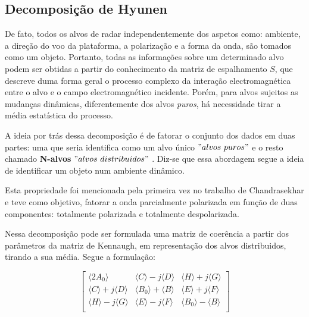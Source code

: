 \documentclass{article}
\begin{document}
\subsection{\textbf{Decomposição de Hyunen}}

De fato, todos os alvos de radar independentemente dos aspetos como: ambiente, a direção do voo da plataforma, a polarização e a forma da onda, são tomados como um objeto. Portanto, todas as informações sobre um determinado alvo podem ser obtidas a partir do conhecimento da matriz de espalhamento $S$, que descreve duma forma geral o processo complexo da interação electromagnética entre o alvo e o campo electromagnético incidente. Porém, para alvos sujeitos as mudanças dinâmicas, diferentemente dos alvos \textit{puros}, há necessidade tirar a média estatística do processo. 

A ideia por trás dessa decomposição é de fatorar o conjunto dos dados em duas partes: uma que seria identifica como um alvo único $"alvos \ puros"$ e o resto chamado \textbf{N-alvos} $"alvos \ distribuidos"$ \cite{jong:2009}. Diz-se que essa abordagem segue a ideia de identificar um objeto num ambiente dinâmico. 

Esta propriedade foi mencionada pela primeira vez no trabalho de Chandrasekhar e teve como objetivo, fatorar a onda parcialmente polarizada em função de duas componentes:
totalmente polarizada e totalmente despolarizada.

Nessa decomposição pode ser formulada uma matriz de coerência a partir dos parâmetros da matriz de Kennaugh, em representação dos alvos distribuidos, tirando a sua média. Segue a formulação:

\begin{equation}
    \begin{bmatrix}
        \langle2A_{0}\rangle & \langle C \rangle-j\langle D \rangle & \langle H \rangle+j\langle G \rangle\\
        \langle C \rangle+j\langle D \rangle & \langle B_{0} \rangle+\langle B \rangle & \langle E \rangle+j\langle F \rangle\\
        \langle H \rangle-j\langle G \rangle & \langle E \rangle-j\langle F \rangle & \langle B_{0} \rangle-\langle B \rangle\\
    \end{bmatrix}
\end{equation}
\end{document}
